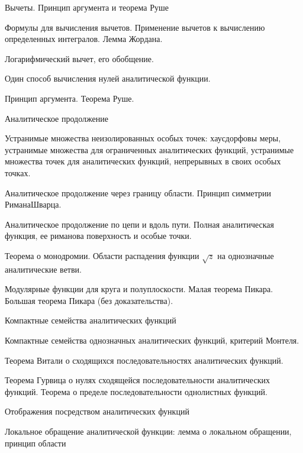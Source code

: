\documentclass[a4paper]{article}
\begin{document}
\begin{nums}{-2}
\item Вычеты. Принцип аргумента и теорема Руше
\begin{items}{-2}
\item Формулы для вычисления вычетов. Применение вычетов к вычислению определенных интегралов. Лемма Жордана.
\item Логарифмический вычет, его обобщение.
\item Один способ вычисления нулей аналитической функции.
\item Принцип аргумента. Теорема Руше.
\end{items}
\item Аналитическое продолжение
\begin{items}{-2}
\item Устранимые множества неизолированных особых точек: хаусдорфовы меры, устранимые множества для
      ограниченных аналитических функций, устранимые множества точек для аналитических функций,
      непрерывных в своих особых точках.
\item Аналитическое продолжение через границу области. Принцип симметрии Римана\ч Шварца.
\item Аналитическое продолжение по цепи и вдоль пути. Полная аналитическая функция, ее риманова
      поверхность и особые точки.
\item Теорема о монодромии. Области распадения функции $\sqrt z$ на однозначные аналитические ветви.
\item Модулярные функции для круга и полуплоскости. Малая теорема Пикара. Большая теорема Пикара (без доказательства).
\end{items}
\item Компактные семейства аналитических функций
\begin{items}{-2}
\item Компактные семейства однозначных аналитических функций, критерий Монтеля.
\item Теорема Витали о сходящихся последовательностях аналитических функций.
\item Теорема Гурвица о нулях сходящейся последовательности аналитических функций. Теорема о пределе
      последовательности однолистных функций.
\end{items}
\item Отображения посредством аналитических функций
\begin{items}{-2}
\item Локальное обращение аналитической функции: лемма о локальном обращении, принцип области

\end{items}
\end{nums}
\end{document}
